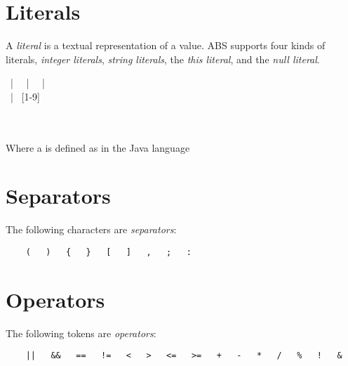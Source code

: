 \section{Literals}
A \emph{literal} is a textual representation of a value.
ABS supports four kinds of literals, \emph{integer literals}, \emph{string literals}, the \emph{this literal}, and the \emph{null literal}.

\begin{abssyntax}
        {}
                ~|~ 
                ~|~ 
                ~|~ 
                \\
     ~|~ [1-9]\MANY{[0-9]}\\
  {}  \\
    {}\\
    {}
\end{abssyntax}

\noindent
Where a  is defined as in the Java language \cite[p.~28]{gosling96}

\section{Separators}
The following characters are \emph{separators}:
\begin{verbatim}
    (   )   {   }   [   ]   ,   ;   :
\end{verbatim}

\section{Operators}
The following tokens are \emph{operators}:
\begin{verbatim}
    ||   &&   ==   !=   <   >   <=   >=   +   -   *   /   %   !   &   
\end{verbatim}
